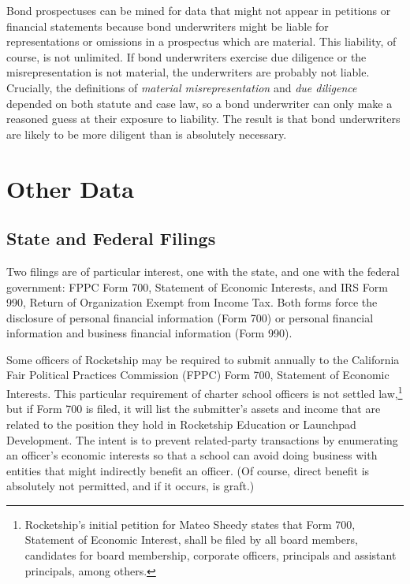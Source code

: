Bond prospectuses can be mined for data that might not appear in petitions or financial statements because bond underwriters might be liable for representations or omissions in a prospectus which are material. This liability, of course, is not unlimited. If bond underwriters exercise due diligence or the misrepresentation is not material, the underwriters are probably not liable. Crucially, the definitions of \textit{material misrepresentation} and \textit{due diligence} depended on both statute and case law, so a bond underwriter can only make a reasoned guess at their exposure to liability. The result is that bond underwriters are likely to be more diligent than is absolutely necessary.

\section{Other Data}\label{other-data}\indent%

\subsection{State and Federal Filings}\label{sec:state-federal-filings}\indent%

Two filings are of particular interest, one with the state, and one with the federal government: FPPC Form 700, Statement of Economic Interests, and IRS Form 990, Return of Organization Exempt from Income Tax. Both forms force the disclosure of personal financial information (Form 700) or personal financial information and business financial information (Form 990). 

Some officers of Rocketship may be required to submit annually to the California Fair Political Practices Commission (FPPC) Form 700, Statement of Economic Interests. This particular requirement of charter school officers is not settled law,\footnote{Rocketship's initial petition for Mateo Sheedy states that Form 700, Statement of Economic Interest, shall be filed by all board members, candidates for board membership, corporate officers, principals and assistant principals, among others.} but if Form 700 is filed, it will list the submitter's assets and income that are related to the position they hold in Rocketship Education or Launchpad Development. The intent is to prevent related-party transactions by enumerating an officer's economic interests so that a school can avoid doing business with entities that might indirectly benefit an officer. (Of course, direct benefit is absolutely not permitted, and if it occurs, is graft.)  


